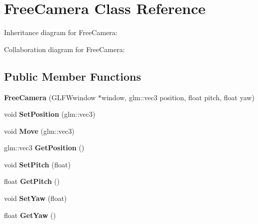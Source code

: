 \hypertarget{class_free_camera}{\section{Free\-Camera Class Reference}
\label{class_free_camera}
}


Inheritance diagram for Free\-Camera\-:


Collaboration diagram for Free\-Camera\-:
\subsection*{Public Member Functions}
\begin{DoxyCompactItemize}
\item 
\hypertarget{class_free_camera_ad5ddfb4a6bd8863dfef64f9b9ec17b1f}{{\bfseries Free\-Camera} (G\-L\-F\-Wwindow $\ast$window, glm\-::vec3 position, float pitch, float yaw)}\label{class_free_camera_ad5ddfb4a6bd8863dfef64f9b9ec17b1f}

\item 
\hypertarget{class_free_camera_a7787af94c9e39be7253f51530d0fd245}{void {\bfseries Set\-Position} (glm\-::vec3)}\label{class_free_camera_a7787af94c9e39be7253f51530d0fd245}

\item 
\hypertarget{class_free_camera_af00a2577e7391de57673489be67b1a92}{void {\bfseries Move} (glm\-::vec3)}\label{class_free_camera_af00a2577e7391de57673489be67b1a92}

\item 
\hypertarget{class_free_camera_ad99b5a8945916b81cb8ad68957cb47b3}{glm\-::vec3 {\bfseries Get\-Position} ()}\label{class_free_camera_ad99b5a8945916b81cb8ad68957cb47b3}

\item 
\hypertarget{class_free_camera_a11e9e7aa35e063297d41efedaab5f212}{void {\bfseries Set\-Pitch} (float)}\label{class_free_camera_a11e9e7aa35e063297d41efedaab5f212}

\item 
\hypertarget{class_free_camera_aafdfc202450742e24d078d7c9490481d}{float {\bfseries Get\-Pitch} ()}\label{class_free_camera_aafdfc202450742e24d078d7c9490481d}

\item 
\hypertarget{class_free_camera_adbb89a495c23658e9a1e176c559d3d76}{void {\bfseries Set\-Yaw} (float)}\label{class_free_camera_adbb89a495c23658e9a1e176c559d3d76}

\item 
\hypertarget{class_free_camera_a0ac6cd4d9d197a754d3ca4908d107499}{float {\bfseries Get\-Yaw} ()}\label{class_free_camera_a0ac6cd4d9d197a754d3ca4908d107499}


\end{DoxyCompactItemize}
